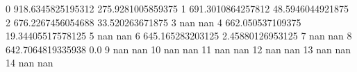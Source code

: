 0 918.6345825195312 275.9281005859375
1 691.3010864257812 48.5946044921875
2 676.2267456054688 33.520263671875
3 nan nan
4 662.050537109375 19.34405517578125
5 nan nan
6 645.165283203125 2.45880126953125
7 nan nan
8 642.7064819335938 0.0
9 nan nan
10 nan nan
11 nan nan
12 nan nan
13 nan nan
14 nan nan

